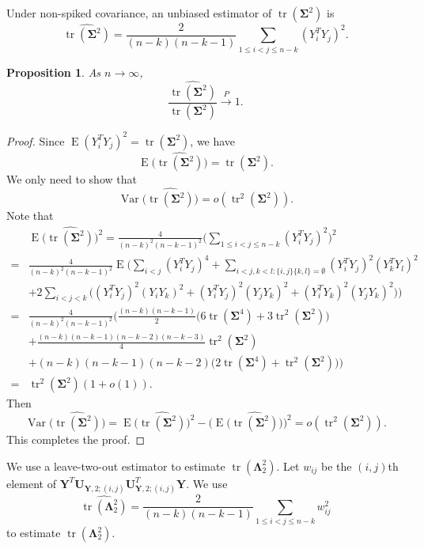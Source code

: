 \documentclass[12pt]{article} %
\DeclareMathOperator{\mytr}{tr}
\DeclareMathOperator{\myE}{E}
\DeclareMathOperator{\myVar}{Var}
\newcommand{\bY}{\mathbf{Y}}
\newcommand{\bU}{\mathbf{U}}
\newcommand{\bfsym}[1]{\ensuremath{\boldsymbol{#1}}}
\def\bLambda {\bfsym {\Lambda}}
\def\bSigma {\bfsym {\Sigma}}
\newtheorem{proposition}{Proposition}
\theoremstyle{definition}
\begin{document}
Under non-spiked covariance, an unbiased estimator of $\mytr(\bSigma^2)$ is
$$
\widehat{\mytr(\bSigma^2)}=\frac{2}{(n-k)(n-k-1)}\sum_{1\leq i<j\leq n-k}(Y_i^T Y_j)^2.
$$
\begin{proposition}\label{prop:nonSpiked}
As $n\to \infty$,
$$
\frac{\widehat{\mytr(\bSigma^2)}}{\mytr(\bSigma^2)}\xrightarrow{P} 1.
$$
\end{proposition}
\begin{proof}
    Since $\myE (Y_i^T Y_j)^2=\mytr(\bSigma^2)$, we have
$$
    \myE\big(\widehat{\mytr(\bSigma^2)}\big)=\mytr(\bSigma^2).
    $$
    We only need to show that 
    $$
    \myVar\big(\widehat{\mytr(\bSigma^2)}\big) =o(\mytr^2(\bSigma^2)).
    $$
     Note that
     $$
    \begin{aligned}
        &\myE\big(\widehat{\mytr(\bSigma^2)}\big)^2 =
        \frac{4}{(n-k)^2(n-k-1)^2}\Big(\sum_{1\leq i < j\leq n-k}(Y_i^T Y_j)^2\Big)^2\\
        =&
        \frac{4}{(n-k)^2(n-k-1)^2}\myE\Big( \sum_{i<j}(Y_i^T Y_j)^4+
        \sum_{i<j,k<l:\{i,j\}\{k,l\}=\emptyset}(Y_i^T Y_j)^2 (Y_k^T Y_l)^2\\
        &+2\sum_{i<j<k}\big((Y_i^T Y_j)^2(Y_i Y_k)^2+(Y_i^T Y_j)^2(Y_j Y_k)^2+(Y_i^T Y_k)^2(Y_j Y_k)^2\big) \Big)\\
        =&
\frac{4}{(n-k)^2(n-k-1)^2}\Big(
        \frac{(n-k)(n-k-1)}{2}\big(6\mytr(\bSigma^4)+3\mytr^2(\bSigma^2)\big)\\
        &+\frac{(n-k)(n-k-1)(n-k-2)(n-k-3)}{4}\mytr^2(\bSigma^2)\\
        &+(n-k)(n-k-1)(n-k-2)\big(2\mytr(\bSigma^4)
        +\mytr^2(\bSigma^2)\big)
        \Big)\\
        =&
        \mytr^2(\bSigma^2)(1+o(1)).
    \end{aligned}
     $$
     Then
    $$
    \myVar\big(\widehat{\mytr(\bSigma^2)}\big) =
        \myE\big(\widehat{\mytr(\bSigma^2)}\big)^2 - 
        \big(\myE\big(\widehat{\mytr(\bSigma^2)}\big)\big)^2=
        o(\mytr^2(\bSigma^2)).
    $$
    This completes the proof.
\end{proof}
We use a leave-two-out estimator to estimate $\mytr(\bLambda_2^2)$.
Let $w_{ij}$ be the $(i,j)$th element of $\bY^T \bU_{\bY,2;(i,j)} \bU_{\bY,2;(i,j)}^T \bY$.
We use
$$
\widehat{\mytr(\bLambda_2^2)}=\frac{2}{(n-k)(n-k-1)}\sum_{1\leq i<j\leq n-k}w_{ij}^2
$$
to estimate $\mytr(\bLambda_2^2)$.
\end{document}
